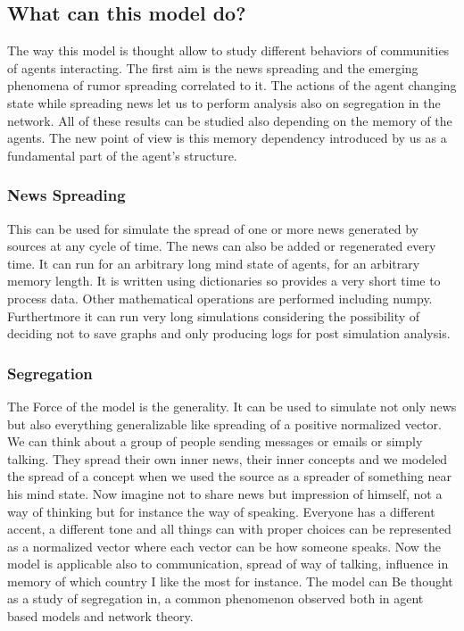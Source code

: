 \subsection{What can this model do?}
The way this model is thought allow to study different behaviors of
communities of agents interacting.
The first aim is the news spreading and the emerging phenomena of
rumor spreading correlated to it.
The actions of the agent changing state while spreading news let
us to perform analysis also on segregation in the network.
All of these results can be studied also depending on the memory
of the agents. The new point of view is this memory dependency
introduced by us as a fundamental part of the agent's structure.

\subsubsection{News Spreading}
This can be used for simulate the spread of one or more news generated
by sources at any cycle of time. The news can also be added or regenerated
every time. It can run for an arbitrary long mind state of agents,
for an arbitrary memory length.
It is written using dictionaries so provides a very short time to process data.
Other mathematical operations are performed including numpy.
Furthertmore it can run very long simulations considering the possibility
of deciding not to save graphs and only producing logs for post simulation
analysis.

\subsubsection{Segregation}
The Force of the model is the generality. It can be used to simulate not
only news but also everything generalizable like spreading of a positive
normalized vector.
We can think about a group of people sending messages or emails or simply
talking. They spread their own inner news, their inner concepts and we modeled
the spread of a concept when we used the source as a spreader of something near
his mind state.
Now imagine not to share news but impression of himself, not a way of thinking
but for instance the way of speaking. Everyone has a different accent, a
different tone and all things can with proper choices can be represented
as a normalized vector where each vector can be how someone speaks.
Now the model is applicable also to communication, spread of way of talking,
influence in memory of which country I like the most for instance.
The model can Be thought as a study of segregation in, a common phenomenon
observed both in agent based models and network theory.
